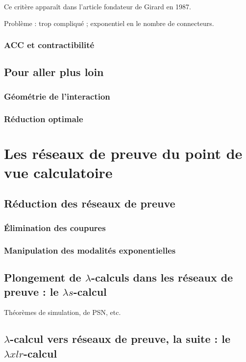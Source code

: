 \documentclass[a4paper, 11pt]{article}
\begin{document}
Ce critère apparaît dans l'article fondateur de Girard en 1987.

Problème : trop compliqué ; exponentiel en le nombre de connecteurs.

\subsubsection{ACC et contractibilité}

\subsection{Pour aller plus loin}

\subsubsection{Géométrie de l'interaction}

\subsubsection{Réduction optimale}


\section{Les réseaux de preuve du point de vue calculatoire}

\subsection{Réduction des réseaux de preuve}

\subsubsection{Élimination des coupures}

\subsubsection{Manipulation des modalités exponentielles}

\subsection{Plongement de $\lambda$-calculs dans les réseaux de preuve : le $\lambda s$-calcul}

Théorèmes de simulation, de PSN, etc. 

\subsection{$\lambda$-calcul vers réseaux de preuve, la suite : le $\lambda x l r$-calcul}
\end{document}
